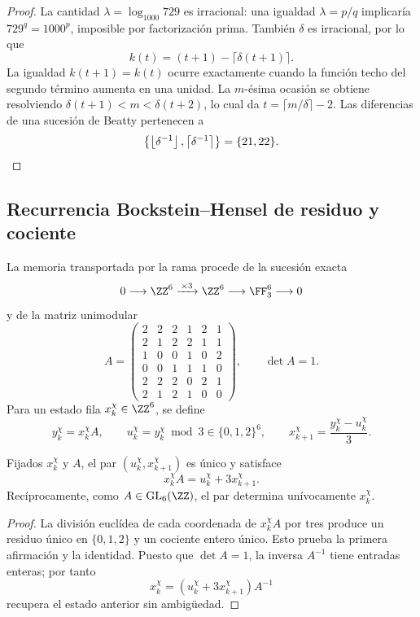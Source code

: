 \begin{proof}
La cantidad \(\lambda=\log_{1000}729\) es irracional: una igualdad
\(\lambda=p/q\) implicaría \(729^q=1000^p\), imposible por factorización
prima. También \(\delta\) es irracional, por lo que
\[
k(t)=(t+1)-\lceil\delta(t+1)\rceil.
\]
La igualdad \(k(t+1)=k(t)\) ocurre exactamente cuando la función techo del
segundo término aumenta en una unidad. La \(m\)-ésima ocasión se obtiene
resolviendo
\(\delta(t+1)<m<\delta(t+2)\), lo cual da
\(t=\lceil m/\delta\rceil-2\). Las diferencias de una sucesión de Beatty
pertenecen a
\[
\left\{\left\lfloor\delta^{-1}\right\rfloor,
\left\lceil\delta^{-1}\right\rceil\right\}=\{21,22\}.\qedhere
\]
\end{proof}

\subsection{Recurrencia Bockstein--Hensel de residuo y cociente}

La memoria transportada por la rama procede de la sucesión exacta
\[
0\longrightarrow\ZZ^6\xrightarrow{\,\times3\,}\ZZ^6
\longrightarrow\FF_3^6\longrightarrow0
\]
y de la matriz unimodular
\[
A=
\begin{pmatrix}
2&2&2&1&2&1\\
2&1&2&2&1&1\\
1&0&0&1&0&2\\
0&0&1&1&1&0\\
2&2&2&0&2&1\\
2&1&2&1&0&0
\end{pmatrix},
\qquad\det A=1.
\]
Para un estado fila \(x_k^\chi\in\ZZ^6\), se define
\[
y_k^\chi=x_k^\chi A,
\qquad
u_k^\chi=y_k^\chi\bmod3\in\{0,1,2\}^6,
\qquad
x_{k+1}^\chi=\frac{y_k^\chi-u_k^\chi}{3}.
\]

\begin{proposition}
\label{prop:memoria-bockstein-hensel}
Fijados \(x_k^\chi\) y \(A\), el par
\((u_k^\chi,x_{k+1}^\chi)\) es único y satisface
\[
x_k^\chi A=u_k^\chi+3x_{k+1}^\chi.
\]
Recíprocamente, como \(A\in\operatorname{GL}_6(\ZZ)\), el par determina
unívocamente \(x_k^\chi\).
\end{proposition}

\begin{proof}
La división euclídea de cada coordenada de \(x_k^\chi A\) por tres produce
un residuo único en \(\{0,1,2\}\) y un cociente entero único. Esto prueba
la primera afirmación y la identidad. Puesto que \(\det A=1\), la inversa
\(A^{-1}\) tiene entradas enteras; por tanto
\[
x_k^\chi=(u_k^\chi+3x_{k+1}^\chi)A^{-1}
\]
recupera el estado anterior sin ambigüedad.
\end{proof}

